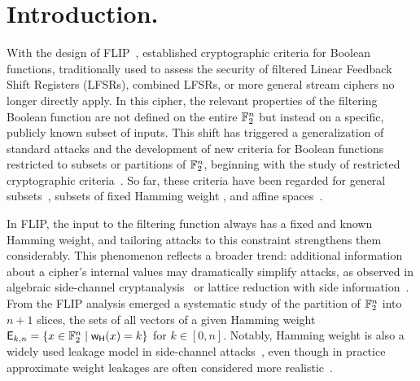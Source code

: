\documentclass[11pt]{llncs}
\begin{document}

\section{Introduction.}

With the design of FLIP~\cite{EC:MJSC16}, established cryptographic criteria for Boolean functions, traditionally used to assess the security of filtered Linear Feedback Shift Registers (LFSRs), combined LFSRs, or more general stream ciphers no longer directly apply.
In this cipher, the relevant properties of the filtering Boolean function are not defined on the entire $\mathbb{F}_2^n$ but instead on a specific, publicly known subset of inputs.
This shift has triggered a generalization of standard attacks and the development of new criteria for Boolean functions restricted to subsets or partitions of $\mathbb{F}_2^n$, beginning with the study of restricted cryptographic criteria~\cite{TOSC:CarMeaRot17}.
So far, these criteria have been regarded for general subsets~\cite{TOSC:CarMeaRot17,CANS:BonMea25}, subsets of fixed Hamming weight \eg \cite{IC:MMMRS18,Mesnager2018,DAM:GinMea22}, and affine spaces~\cite{DCC:CarFeuSal25}.


In FLIP, the input to the filtering function always has a fixed and known Hamming weight, and tailoring attacks to this constraint strengthens them considerably.
This phenomenon reflects a broader trend: additional information about a cipher’s internal values may dramatically simplify attacks, as observed in algebraic side-channel cryptanalysis~\cite{INS:RenSta09} or lattice reduction with side information~\cite{C:DDGR20}.
From the FLIP analysis emerged a systematic study of the partition of $\mathbb{F}_2^n$ into $n+1$ slices, the sets of all vectors of a given Hamming weight $\mathsf{E}_{k,n}=\{x \in \mathbb{F}_2^n \mid \mathsf{w_H}(x)=k\}$ for $k\in[0,n]$.
Notably, Hamming weight is also a widely used leakage model in side-channel attacks~\cite{book:JoyOli05,book:Standaert10,TCHES:DMMS20}, even though in practice approximate weight leakages are often considered more realistic~\cite{CHES:ORSW12,AC:BFG14,C:HMMRSU23}.
\end{document}
